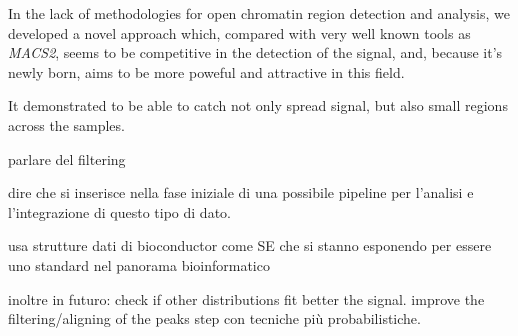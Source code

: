 

In the lack of methodologies for open chromatin region detection and analysis, we developed a novel approach which, compared with very well known tools as \textit{MACS2}, seems to be competitive in the detection of the signal, and, because it's newly born, aims to be more poweful and attractive in this field.

It demonstrated to be able to catch not only spread signal, but also small regions across the samples. 

parlare del filtering

dire che si inserisce nella fase iniziale di una possibile pipeline per l'analisi e l'integrazione di questo tipo di dato.

usa strutture dati di bioconductor come SE che si stanno esponendo per essere uno standard nel panorama bioinformatico


inoltre in futuro:
check if other distributions fit better the signal.
improve the filtering/aligning of the peaks step con tecniche più probabilistiche.
